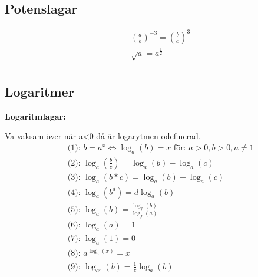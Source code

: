 \subsection{Potenslagar}
\begin{align*}
  &\quad (\frac{a}{b})^{-3} = (\frac{b}{a})^{3}\\
  &\quad \sqrt{a} = a^{\frac{1}{2}} \\
\end{align*}


\subsection{Logaritmer}
%


\textbf{Logaritmlagar:}\par
Va vaksam över när a<0 då är logarytmen odefinerad. 
\begin{align*}
  &\quad \text{(1): } b = a^x \Leftrightarrow \log_a(b) = x  \text{ för: } a>0, b>0, a \ne 1  \\
  &\quad \text{(2): } \log_a(\frac{b}{c}) = \log_a(b) - \log_a(c) \\
  &\quad \text{(3): } \log_a(b*c) = \log_a(b) + \log_a(c) \\
  &\quad \text{(4): } \log_a(b^d) = d\log_a(b) \\
  &\quad \text{(5): } \log_a(b) = \frac{\log_f(b)}{\log_f(a)} \\
  &\quad \text{(6): } \log_a(a) = 1 \\
  &\quad \text{(7): } \log_a(1) = 0 \\
  &\quad \text{(8): } a^{\log_a(x)} = x \\
  &\quad \text{(9): } \log_{a^c}(b) = \frac{1}{c} \log_a(b) \\
\end{align*}

